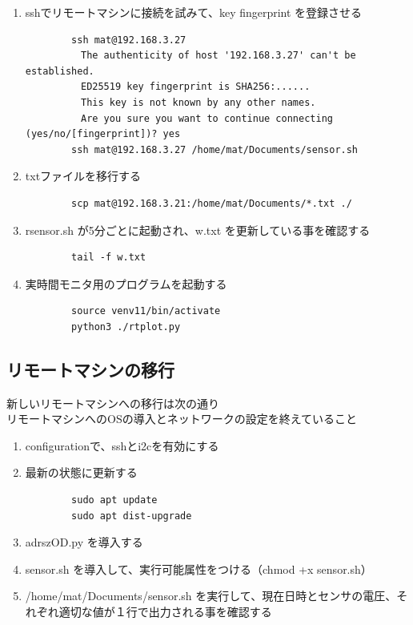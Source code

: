 \documentclass[12pt,a4paper,uplatex]{jsarticle}
\begin{document}
\begin{enumerate}
\begin{verbatim}
	\end{verbatim}
	\item sshでリモートマシンに接続を試みて、key fingerprint を登録させる
	\begin{verbatim}
		ssh mat@192.168.3.27
		　The authenticity of host '192.168.3.27' can't be established.
		　ED25519 key fingerprint is SHA256:......
		　This key is not known by any other names.
		　Are you sure you want to continue connecting (yes/no/[fingerprint])? yes
		ssh mat@192.168.3.27 /home/mat/Documents/sensor.sh
	\end{verbatim}
	\item txtファイルを移行する
	\begin{verbatim}
		scp mat@192.168.3.21:/home/mat/Documents/*.txt ./
	\end{verbatim}
	\item rsensor.sh が5分ごとに起動され、w.txt を更新している事を確認する
	\begin{verbatim}
		tail -f w.txt
	\end{verbatim}
	\item 実時間モニタ用のプログラムを起動する
	\begin{verbatim}
		source venv11/bin/activate
		python3 ./rtplot.py
	\end{verbatim}
\end{enumerate}

\subsection{リモートマシンの移行}

新しいリモートマシンへの移行は次の通り\\リモートマシンへのOSの導入とネットワークの設定を終えていること

\begin{enumerate}
	\item configurationで、sshとi2cを有効にする
	\item 最新の状態に更新する
	\begin{verbatim}
		sudo apt update
		sudo apt dist-upgrade
	\end{verbatim}
	\item adrszOD.py を導入する
	\item sensor.sh を導入して、実行可能属性をつける（chmod +x sensor.sh）
	\item /home/mat/Documents/sensor.sh を実行して、現在日時とセンサの電圧、それぞれ適切な値が１行で出力される事を確認する
\end{enumerate}
\end{document}
